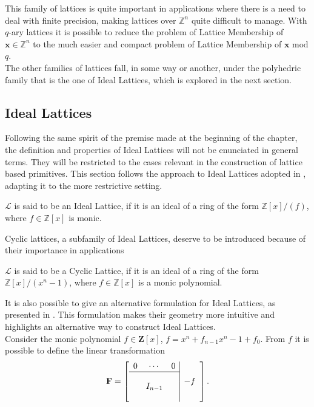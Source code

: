 This family of lattices is quite important in applications where there is a need to deal with finite precision, making lattices over $\mathbb{Z}^n$ quite difficult to manage. With $q$-ary lattices it is possible to reduce the problem of Lattice Membership of $\mathbf{x}\in\mathbb{Z}^n$ to the much easier and compact problem of Lattice Membership of $\mathbf{x}$ $\mathrm{mod}$ $q$.\\
The other families of lattices fall, in some way or another, under the polyhedric family that is the one of Ideal Lattices, which is explored in the next section.

\subsection{Ideal Lattices}\label{sec:bg:ideal}

Following the same spirit of the premise made at the beginning of the chapter, the definition and properties of Ideal Lattices will not be enunciated in general terms. They will be restricted to the cases relevant in the construction of lattice based primitives. This section follows the approach to Ideal Lattices adopted in \cite{ideal_lattices}, adapting it to the more restrictive setting.

\begin{definition}
$\mathscr{L}$ is said to be an Ideal Lattice, if it is an ideal of a ring of the form $\mathbb{Z}[x]/(f)$, where $f\in\mathbb{Z}[x]$ is monic.\\
\end{definition}

Cyclic lattices, a subfamily of Ideal Lattices, deserve to be introduced because of their importance in applications

\begin{definition}
$\mathscr{L}$ is said to be a Cyclic Lattice, if it is an ideal of a ring of the form $\mathbb{Z}[x]/(x^n-1)$, where $f\in\mathbb{Z}[x]$ is a monic polynomial.\\
\end{definition}

It is also possible to give an alternative formulation for Ideal Lattices, as presented in \cite{PQC}. This formulation makes their geometry more intuitive and highlights an alternative way to construct Ideal Lattices.\\
Consider the monic polynomial $f\in\mathbf{Z}[x]$, $f=x^n+f_{n-1}x^n-1 + f_0$. From $f$ it is possible to define the linear transformation
\begin{equation*}
\mathbf{F}=
\left[\begin{array}{ccc|c}
0&\cdots&0&\multirow{4}{*}{$-f$}\\
\cline{1-3}
&&&\\
&I_{n-1}&&\\
&&&
\end{array}\right].
\end{equation*}

